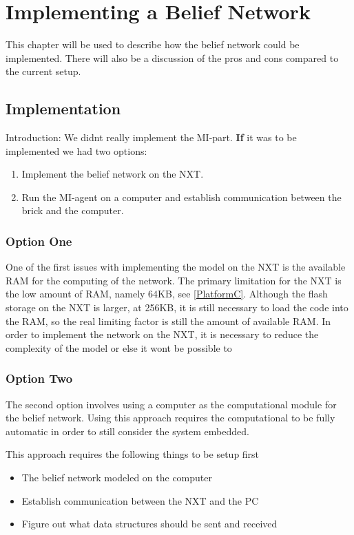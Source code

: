 \chapter{Implementing a Belief Network}
This chapter will be used to describe how the belief network could be
implemented. There will also be a discussion of the pros and cons compared to
the current setup.

\section{Implementation}

Introduction: We didnt really implement the MI-part.
\textbf{If} it was to be implemented we had two options:

\begin{enumerate}
\item Implement the belief network on the NXT.
\item Run the MI-agent on a computer and establish communication between the brick and the computer.
\end{enumerate}

\subsection{Option One}
One of the first issues with implementing the model on the NXT is the available
RAM for the computing of the network. The primary limitation for the NXT is the
low amount of RAM, namely 64KB, see \autoref{PlatformC}. Although the flash
storage on the NXT is larger, at 256KB, it is still necessary to load the code
into the RAM, so the real limiting factor is still the amount of available RAM.
 In order to implement the network
on the NXT, it is necessary to reduce the complexity of the model or else it wont
be possible to 

\subsection{Option Two}
The second option involves using a computer as the computational module for the
belief network. Using this approach requires the computational to be fully
automatic in order to still consider the system embedded.

This approach requires the following things to be setup first
\begin{itemize}
\item The belief network modeled on the computer
\item Establish communication between the NXT and the PC
\item Figure out what data structures should be sent and received
\end{itemize}

